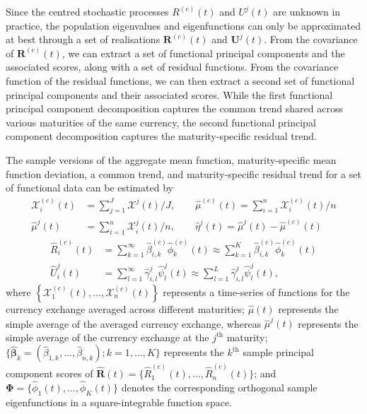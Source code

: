 \documentclass[12pt,a4paper]{article}
\newcommand{\X}{\mathcal{X}}
\begin{document}
Since the centred stochastic processes $R^{(c)}(t)$ and $U^j(t)$ are unknown in practice, the population eigenvalues and eigenfunctions can only be approximated at best through a set of realisations $\bm{R}^{(c)}(t)$ and $\bm{U}^j(t)$. From the covariance of $\bm{R}^{(c)}(t)$, we can extract a set of functional principal components and the associated scores, along with a set of residual functions. From the covariance function of the residual functions, we can then extract a second set of functional principal components and their associated scores. While the first functional principal component decomposition captures the common trend shared across various maturities of the same currency, the second functional principal component decomposition captures the maturity-specific residual trend.

The sample versions of the aggregate mean function, maturity-specific mean function deviation, a common trend, and maturity-specific residual trend for a set of functional data can be estimated by
\begin{align}
\X_i^{(c)}(t) &= \sum^J_{j=1}\X^j(t)/J, \qquad \widehat{\mu}^{(c)}(t) = \sum^n_{i=1}\X_i^{(c)}(t)/n \label{eq:6}\\
\widehat{\mu}^j(t) &= \sum^n_{i=1}\X_i^j(t)/n, \qquad \widehat{\eta}^j(t) = \widehat{\mu}^j(t) - \widehat{\mu}^{(c)}(t) 
\end{align}
\begin{align}
\widehat{R}_i^{(c)}(t) &= \sum^{\infty}_{k=1}\widehat{\beta}^{(c)}_{i,k}\widehat{\phi}^{(c)}_k(t) \approx \sum^K_{k=1}\widehat{\beta}^{(c)}_{i,k}\widehat{\phi}_k^{(c)}(t) \\
\widehat{U}_i^j(t) &= \sum^{\infty}_{l=1}\widehat{\gamma}_{i,l}^j\widehat{\psi}_l^j(t) \approx \sum^L_{l=1}\widehat{\gamma}_{i,l}^j\widehat{\psi}_l^j(t),\label{eq:9}
\end{align}
where $\left\{\X_1^{(c)}(t),\dots,\X_n^{(c)}(t)\right\}$ represents a time-series of functions for the currency exchange averaged across different maturities; $\widehat{\mu}(t)$ represents the simple average of the averaged currency exchange, whereas $\widehat{\mu}^j(t)$ represents the simple average of the currency exchange at the $j^{\text{th}}$ maturity; $\big\{\widehat{\bm{\beta}}_k = (\widehat{\beta}_{1,k},\dots,\widehat{\beta}_{n,k}); k=1,\dots,K\big\}$ represents the $k^{\text{th}}$ sample principal component scores of $\widehat{\bm{R}}(t)=\{\widehat{R}_1^{(c)}(t),\dots, \widehat{R}_n^{(c)}(t)\}$; and $\bm{\Phi} = \big\{\widehat{\phi}_1(t),\dots,\widehat{\phi}_K(t)\big\}$ denotes the corresponding orthogonal sample eigenfunctions in a square-integrable function space.
\end{document}

